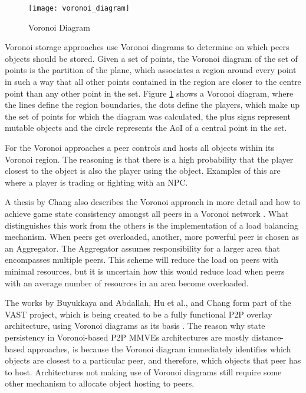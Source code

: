 \begin{figure}[htbp]
 \centering
 \texttt{[image: voronoi\_diagram]}
 \caption{Voronoi Diagram \cite{Buyukkaya_voronoi_state_management}}
 \label{fig_voronoi_diagram}
\end{figure}
%
Voronoi storage approaches use Voronoi diagrams to determine on which peers objects should be stored. Given a set of points, the Voronoi diagram of the set of points is the partition of the plane, which associates a region around every point in such a way that all other points contained in the region are closer to the centre point than any other point in the set. Figure \ref{fig_voronoi_diagram} shows a Voronoi diagram, where the lines define the region boundaries, the dots define the players, which make up the set of points for which the diagram was calculated, the plus signs represent mutable objects and the circle represents the AoI of a central point in the set.

For the Voronoi approaches a peer controls and hosts all objects within its Voronoi region. The reasoning is that there is a high probability that the player closest to the object is also the player using the object. Examples of this are where a player is trading or fighting with an NPC.

A thesis by Chang also describes the Voronoi approach in more detail and how to achieve game state consistency amongst all peers in a Voronoi network \cite{Chang_Voronoi_state_management_masters}. What distinguishes this work from the others is the implementation of a load balancing mechanism. When peers get overloaded, another, more powerful peer is chosen as an Aggregator. The Aggregator assumes responsibility for a larger area that encompasses multiple peers. This scheme will reduce the load on peers with minimal resources, but it is uncertain how this would reduce load when peers with an average number of resources in an area become overloaded.

The works by Buyukkaya and Abdallah, Hu et al., and Chang form part of the VAST project, which is being created to be a fully functional P2P overlay architecture, using Voronoi diagrams as its basis \cite{VAST}. The reason why state persistency in Voronoi-based P2P MMVEs architectures are mostly distance-based approaches, is because the Voronoi diagram immediately identifies which objects are closest to a particular peer, and therefore, which objects that peer has to host. Architectures not making use of Voronoi diagrams still require some other mechanism to allocate object hosting to peers.

